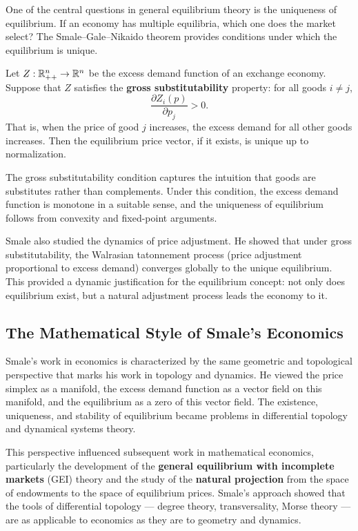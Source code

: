 One of the central questions in general equilibrium theory is the uniqueness of equilibrium. If an economy has multiple equilibria, which one does the market select? The Smale--Gale--Nikaido theorem provides conditions under which the equilibrium is unique.

\begin{theorem}
Let \(Z: \mathbb{R}^n_{++} \to \mathbb{R}^n\) be the excess demand function of an exchange economy. Suppose that \(Z\) satisfies the \textbf{gross substitutability} property: for all goods \(i \neq j\),
\[
\frac{\partial Z_i(p)}{\partial p_j} > 0.
\]
That is, when the price of good \(j\) increases, the excess demand for all other goods increases. Then the equilibrium price vector, if it exists, is unique up to normalization.
\end{theorem}

The gross substitutability condition captures the intuition that goods are substitutes rather than complements. Under this condition, the excess demand function is monotone in a suitable sense, and the uniqueness of equilibrium follows from convexity and fixed-point arguments.

Smale also studied the dynamics of price adjustment. He showed that under gross substitutability, the Walrasian tatonnement process (price adjustment proportional to excess demand) converges globally to the unique equilibrium. This provided a dynamic justification for the equilibrium concept: not only does equilibrium exist, but a natural adjustment process leads the economy to it.

\subsection{The Mathematical Style of Smale's Economics}

Smale's work in economics is characterized by the same geometric and topological perspective that marks his work in topology and dynamics. He viewed the price simplex as a manifold, the excess demand function as a vector field on this manifold, and the equilibrium as a zero of this vector field. The existence, uniqueness, and stability of equilibrium became problems in differential topology and dynamical systems theory.

This perspective influenced subsequent work in mathematical economics, particularly the development of the \textbf{general equilibrium with incomplete markets} (GEI) theory and the study of the \textbf{natural projection} from the space of endowments to the space of equilibrium prices. Smale's approach showed that the tools of differential topology --- degree theory, transversality, Morse theory --- are as applicable to economics as they are to geometry and dynamics.

